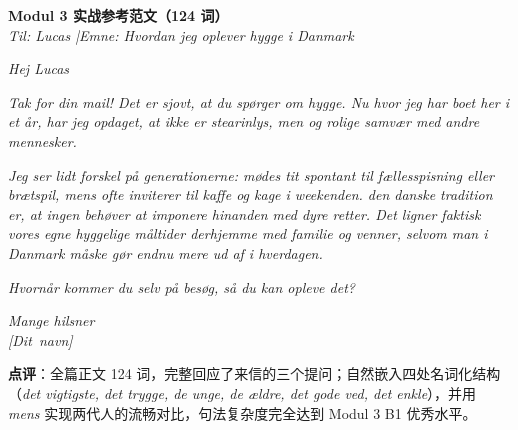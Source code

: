 \begin{answerbox}
\textbf{Modul 3 实战参考范文（124 词）}\\
\textit{Til: Lucas \quad|\quad Emne: Hvordan jeg oplever hygge i Danmark}

\textit{Hej Lucas}

\textit{Tak for din mail! Det er sjovt, at du spørger om hygge. Nu hvor jeg har boet her i et år, har jeg opdaget, at  ikke er stearinlys, men  og rolige samvær med andre mennesker.}

\textit{Jeg ser lidt forskel på generationerne:  mødes tit spontant til fællesspisning eller brætspil, mens  ofte inviterer til kaffe og kage i weekenden.  den danske tradition er, at ingen behøver at imponere hinanden med dyre retter. Det ligner faktisk vores egne hyggelige måltider derhjemme med familie og venner, selvom man i Danmark måske gør endnu mere ud af  i hverdagen.}

\textit{Hvornår kommer du selv på besøg, så du kan opleve det?}

\textit{Mange hilsner\\
\mbox{[Dit navn]}}

\small\textbf{点评}：全篇正文 124 词，完整回应了来信的三个提问；自然嵌入四处名词化结构（\textit{det vigtigste, det trygge, de unge, de ældre, det gode ved, det enkle}），并用 \textit{mens} 实现两代人的流畅对比，句法复杂度完全达到 Modul 3 B1 优秀水平。
\end{answerbox}
